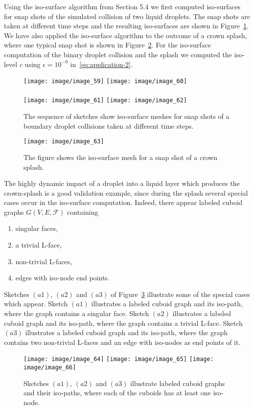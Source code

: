\documentclass[a4paper,11pt]{article}
\begin{document}
Using the iso-surface algorithm from Section 5.4 we first computed iso-surfaces for snap shots of the
simulated collision of two liquid droplets. The snap shots are taken at different time steps and the
resulting iso-surfaces are shown in Figure~\ref{image_59_60_61_62}. We have also applied the
iso-surface algorithm to the outcome of a crown splash, where one typical snap shot is shown in
Figure~\ref{image_63}. For the iso-surface computation of the binary droplet collision and
the splash we computed the iso-level $c$ using $\epsilon=10^{-9}$ in~\eqref{eq:application-2}.
\begin{figure}[!ht]
\texttt{[image: image/image\_59]}\hspace{1cm}
\texttt{[image: image/image\_60]}\\ \\
\texttt{[image: image/image\_61]}\hspace{1cm}
\texttt{[image: image/image\_62]}
\caption{The sequence of sketches show iso-surface meshes for snap shots of a boundary droplet collisions taken at different
time steps.}
\label{image_59_60_61_62}
\end{figure}
\begin{figure}[!ht]
\texttt{[image: image/image\_63]}
\caption{The figure shows the iso-surface mesh for a snap shot of a crown splash.}
\label{image_63}
\end{figure}
\FloatBarrier

The highly dynamic impact of a droplet into a liquid layer which produces the crown-splash is a good
validation example, since during the splash several special cases occur in the iso-surface computation.
Indeed, there appear labeled cuboid graphs $G(V,E,\mathcal{F})$ containing
\begin{enumerate}
\item singular faces,
\item a trivial L-face,
\item non-trivial L-faces,
\item edges with iso-node end points.
\end{enumerate}

Sketches $(a1)$, $(a2)$ and $(a3)$ of Figure~\ref{image_64_65_66} illustrate some of the special
cases which appear. Sketch $(a1)$ illustrates a labeled cuboid graph and its iso-path, where the graph
contains a singular face. Sketch $(a2)$ illustrates a labeled cuboid graph and its iso-path, where the
graph contains a trivial L-face. Sketch $(a3)$ illustrates a labeled cuboid graph and its iso-path, where
the graph contains two non-trivial L-faces and an edge with iso-nodes as end points of it.
\begin{figure}[!ht]
\texttt{[image: image/image\_64]}\hspace{2cm}
\texttt{[image: image/image\_65]}\hspace{2cm}
\texttt{[image: image/image\_66]}
\caption{Sketches $(a1)$, $(a2)$ and $(a3)$ illustrate labeled cuboid graphs and their iso-paths, where each of the
cuboids has at least one iso-node.}
\label{image_64_65_66}
\end{figure}
\FloatBarrier
\end{document}

